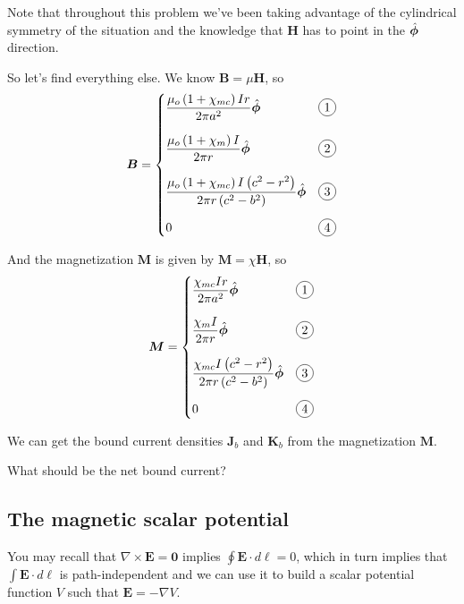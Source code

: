 \documentclass{article}
\newcommand*\circled[1]{\tikz[baseline=(char.base)]{
            \node[shape=circle,draw,inner sep=2pt] (char) {#1};}}
\numberwithin{equation}{section}
\newcommand{\phihat}{\skew{3}{\hat}{\skew{3}{}{\bm{\phi}}}}
\begin{document}
Note that throughout this problem we've been taking advantage of the cylindrical symmetry of the situation and the knowledge that $\bm{H}$ has to point in the $\phihat$ direction.

So let's find everything else. We know $\bm{B} = \mu \bm{H}$, so
\begin{equation*}
    \bm{B} = \begin{cases} \displaystyle \frac{\mu_o \left( 1 + \chi_{mc} \right) I r}{2\pi a^2} \phihat & \circled{1} \\[0.5cm] \displaystyle \frac{\mu_o \left( 1 + \chi_m \right) I}{2\pi r} \phihat & \circled{2} \\[0.5cm] \displaystyle \frac{\mu_o \left( 1 + \chi_{mc} \right) I \left( c^2 - r^2 \right)}{2\pi r \left( c^2 - b^2 \right)} \phihat & \circled{3} \\[0.5cm] \displaystyle 0 & \circled{4} \end{cases}
\end{equation*}

And the magnetization $\bm{M}$ is given by $\bm{M} = \chi \bm{H}$, so
\begin{equation*}
    \bm{M} = \begin{cases} \displaystyle \frac{\chi_{mc} I r}{2\pi a^2} \phihat & \circled{1} \\[0.5cm] \displaystyle \frac{\chi_m I}{2\pi r} \phihat & \circled{2} \\[0.5cm] \displaystyle \frac{\chi_{mc} I \left( c^2 - r^2 \right)}{2\pi r \left( c^2 - b^2 \right)} \phihat & \circled{3} \\[0.5cm] \displaystyle 0 & \circled{4} \end{cases}
\end{equation*}

We can get the bound current densities $\bm{J}_b$ and $\bm{K}_b$ from the magnetization $\bm{M}$. 

What should be the net bound current?

\subsection*{The magnetic scalar potential}

You may recall that $\nabla \times \bm{E} = \bm{0}$ implies $\displaystyle \oint \bm{E} \cdot d\bm{\ell} = 0$, which in turn implies that $\displaystyle \int \bm{E} \cdot d\bm{\ell}$ is path-independent and we can use it to build a scalar potential function $V$ such that $\bm{E} = -\nabla V$.
\end{document}

